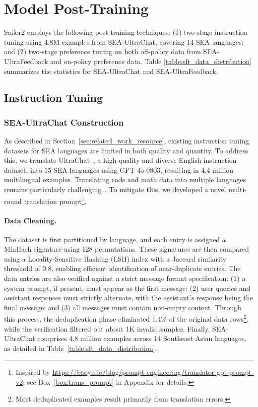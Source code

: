 \section{Model Post-Training}

Sailor2 employs the following post-training techniques: (1) two-stage instruction tuning using 4.8M examples from SEA-UltraChat, covering 14 SEA languages; and (2) two-stage preference tuning on both off-policy data from SEA-UltraFeedback and on-policy preference data. Table \ref{table:sft_data_distribution} summarizes the statistics for SEA-UltraChat and SEA-UltraFeedback.

\subsection{Instruction Tuning}

\subsubsection{SEA-UltraChat Construction}
As described in Section~\ref{sec:related_work_resource}, existing instruction tuning datasets for SEA languages are limited in both quality and quantity. To address this, we translate UltraChat~\citep{ding2023enhancing}, a high-quality and diverse English instruction dataset, into 15 SEA languages using GPT-4o-0803, resulting in 4.4 million multilingual examples. 
Translating code and math data into multiple languages remains particularly challenging~\citep{Huang2025BenchMAXAC}. To mitigate this, we developed a novel multi-round translation prompt\footnote{Inspired by \url{https://baoyu.io/blog/prompt-engineering/translator-gpt-prompt-v2}; see Box~\ref{box:trans_prompt} in Appendix for details.}.

\paragraph{Data Cleaning.}
The dataset is first partitioned by language, and each entry is assigned a MinHash signature \citep{Broder1997OnTR} using 128 permutations. These signatures are then compared using a Locality-Sensitive Hashing (LSH) index \citep{leskovec2014mmds} with a Jaccard similarity threshold of 0.8, enabling efficient identification of near-duplicate entries. 
The data entries are also verified against a strict message format specification: (1) a system prompt, if present, must appear as the first message; (2) user queries and assistant responses must strictly alternate, with the assistant's response being the final message; and (3) all messages must contain non-empty content. 
Through this process, the deduplication phase eliminated 1.4\% of the original data rows\footnote{Most deduplicated examples result primarily from translation errors.}, while the verification filtered out about 1K invalid samples. 
Finally, SEA-UltraChat comprises 4.8 million examples across 14 Southeast Asian languages, as detailed in Table~\ref{table:sft_data_distribution}.

